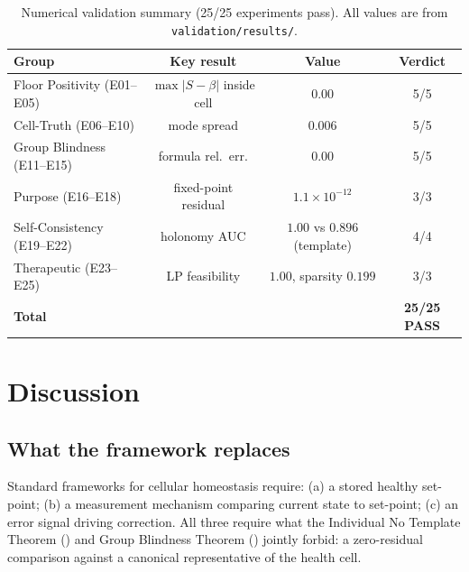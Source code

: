 \documentclass[twocolumn,11pt,a4paper]{article}
\begin{document}
\begin{table}[h!]\centering
\footnotesize
\begin{tabular}{lccc}
\toprule
\textbf{Group} & \textbf{Key result} & \textbf{Value} & \textbf{Verdict}\\
\midrule
Floor Positivity (E01--E05)    & $\max|S-\beta|$ inside cell & $0.00$                       & 5/5 \\
Cell-Truth (E06--E10)          & mode spread                 & $0.006$                      & 5/5 \\
Group Blindness (E11--E15)     & formula rel.\ err.          & $0.00$                       & 5/5 \\
Purpose (E16--E18)             & fixed-point residual        & $1.1\times10^{-12}$          & 3/3 \\
Self-Consistency (E19--E22)    & holonomy AUC                & $1.00$ vs $0.896$ (template) & 4/4 \\
Therapeutic (E23--E25)         & LP feasibility              & $1.00$, sparsity $0.199$     & 3/3 \\
\midrule
\textbf{Total} & & & \textbf{25/25 PASS}\\
\bottomrule
\end{tabular}
\caption{Numerical validation summary (25/25 experiments pass).
All values are from \texttt{validation/results/}.}
\label{tab:validation}
\end{table}



\section{Discussion}
\label{sec:discussion}

\subsection{What the framework replaces}

Standard frameworks for cellular homeostasis require:
(a) a stored healthy set-point; (b) a measurement mechanism comparing
current state to set-point; (c) an error signal driving correction.
All three require what the Individual No Template Theorem
() and Group Blindness Theorem
() jointly forbid: a zero-residual comparison
against a canonical representative of the health cell.
\end{document}
